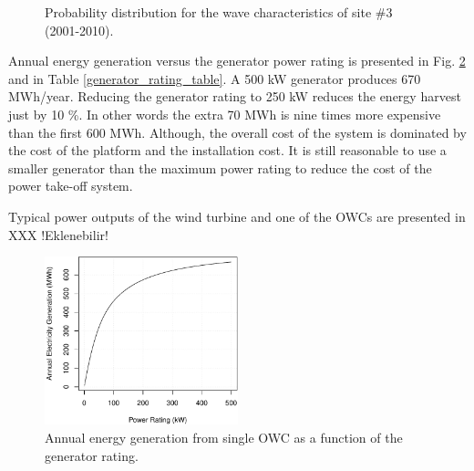\documentclass[twocolumn]{article}
\begin{document}
\begin{figure}[t]
  \centering

    \caption{Probability distribution for the wave characteristics of site \#3 (2001-2010).} 
    \label{spain_site}
\end{figure}

Annual energy generation versus the generator power rating is presented in Fig. \ref{generator_rating} and in Table \ref{generator_rating_table}. A 500 kW generator produces 670 MWh/year. Reducing the generator rating to 250 kW reduces the energy harvest just by 10 \%. In other words the extra 70 MWh is nine times more expensive than the first 600 MWh. Although, the overall cost of the system is dominated by the cost of the platform and the installation cost. It is still reasonable to use a smaller generator than the maximum power rating to reduce the cost of the power take-off system.

Typical power outputs of the wind turbine and one of the OWCs are presented in XXX !Eklenebilir!

  \begin{figure}[t]
    \centering
    \includegraphics[width=0.5\textwidth]{generator_rating}
    \caption{Annual energy generation from single OWC as a function of the generator rating.} 
    \label{generator_rating}
  \end{figure}
  
\end{document}
